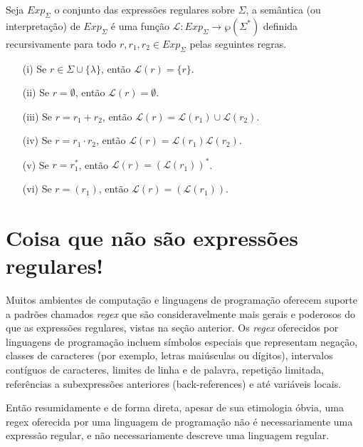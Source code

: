 \begin{definicao}\label{def:ExpRegularesSemantica}
	Seja $Exp_\Sigma$ o conjunto das expressões regulares sobre $\Sigma$,  a semântica (ou interpretação) de $Exp_\Sigma$ é uma função $\mathcal{L}: Exp_\Sigma \rightarrow \wp(\Sigma^*)$ definida recursivamente para todo $r, r_1, r_2  \in Exp_\Sigma$ pelas seguintes regras.
	\begin{itemize}
		\item[(i)] Se $r \in \Sigma \cup \{\lambda\}$, então $\mathcal{L}(r) = \{r\}$.
		\item[(ii)] Se $r = \emptyset$, então $\mathcal{L}(r) = \emptyset$.
		\item[(iii)] Se $r = r_1 + r_2$, então $\mathcal{L}(r) = \mathcal{L}(r_1) \cup \mathcal{L}(r_2)$.
		\item[(iv)] Se $r = r_1 \cdot r_2$, então $\mathcal{L}(r) = \mathcal{L}(r_1)\mathcal{L}(r_2)$.
		\item[(v)] Se $r = r_1^*$, então $\mathcal{L}(r) = (\mathcal{L}(r_1))^*$.
		\item[(vi)] Se $r = (r_1)$, então $\mathcal{L}(r) = (\mathcal{L}(r_1))$.	
	\end{itemize}
\end{definicao}


\section{Coisa que não são expressões regulares!}

Muitos ambientes de computação e linguagens de programação oferecem suporte a padrões chamados \textit{regex} que são consideravelmente mais gerais e poderosos do que as expressões regulares, vistas na seção anterior. Os \textit{regex} oferecidos por linguagens de programação incluem símbolos especiais que representam negação, classes de caracteres (por exemplo, letras maiúsculas ou dígitos), intervalos contíguos de caracteres, limites de linha e de palavra, repetição limitada, referências a subexpressões anteriores (back-references) e até variáveis locais. 

Então resumidamente e de forma direta, apesar de sua etimologia óbvia, uma regex oferecida por uma linguagem de programação não é necessariamente uma expressão regular, e não necessariamente descreve uma linguagem regular.

